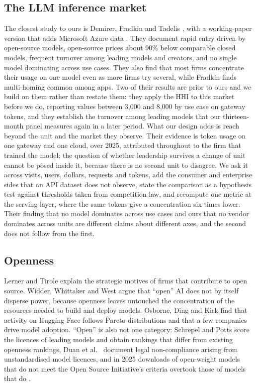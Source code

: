 \documentclass[11pt]{article}
\begin{document}
\subsection{The LLM inference market} The closest study to ours is Demirer, Fradkin and Tadelis \cite{demirer2026emerging}, with a working-paper version that adds Microsoft Azure data \cite{demirer2025emerging}. They document rapid entry driven by open-source models, open-source prices about 90\% below comparable closed models, frequent turnover among leading models and creators, and no single model dominating across use cases. They also find that most firms concentrate their usage on one model even as more firms try several, while Fradkin \cite{fradkin2025demand} finds multi-homing common among apps. Two of their results are prior to ours and we build on them rather than restate them: they apply the HHI to this market before we do, reporting values between 3{,}000 and 8{,}000 by use case on gateway tokens, and they establish the turnover among leading models that our thirteen-month panel measures again in a later period. What our design adds is reach beyond the unit and the market they observe. Their evidence is token usage on one gateway and one cloud, over 2025, attributed throughout to the firm that trained the model; the question of whether leadership survives a change of unit cannot be posed inside it, because there is no second unit to disagree. We ask it across visits, users, dollars, requests and tokens, add the consumer and enterprise sides that an API dataset does not observe, state the comparison as a hypothesis test against thresholds taken from competition law, and recompute one metric at the serving layer, where the same tokens give a concentration six times lower. Their finding that no model dominates across use cases and ours that no vendor dominates across units are different claims about different axes, and the second does not follow from the first.

\subsection{Openness} Lerner and Tirole \cite{lerner2002simple} explain the strategic motives of firms that contribute to open source. Widder, Whittaker and West \cite{widder2024open} argue that ``open'' AI does not by itself disperse power, because openness leaves untouched the concentration of the resources needed to build and deploy models. Osborne, Ding and Kirk \cite{osborne2024ai} find that activity on Hugging Face follows Pareto distributions and that a few companies drive model adoption. ``Open'' is also not one category: Schrepel and Potts \cite{schrepel2025measuring} score the licences of leading models and obtain rankings that differ from existing openness rankings, Duan et al.\ \cite{duan2025position} document legal non-compliance arising from unstandardised model licences, and in 2025 downloads of open-weight models that do not meet the Open Source Initiative's criteria overtook those of models that do \cite{longpre2025economies}.
\end{document}
